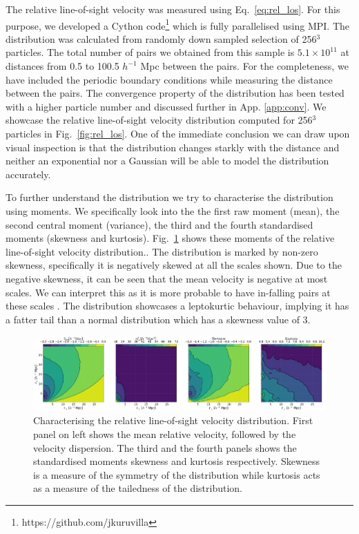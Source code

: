 \documentclass[a4paper,fleqn,usenatbib]{mnras}
\begin{document}
	The relative line-of-sight velocity was measured using Eq.~\ref{eq:rel_los}. For this purpose, we developed a Cython code\footnote{https://github.com/jkuruvilla} which is fully parallelised using MPI. The distribution was calculated from randomly down sampled selection of 256$^3$ particles. The total number of pairs we obtained from this sample is $5.1 \times 10^{11}$ at distances from 0.5 to 100.5 $h^{-1}$ Mpc between the pairs. For the completeness, we have included the periodic boundary conditions while measuring the distance between the pairs. The convergence property of the distribution has been tested with a higher particle number and discussed further in App. \ref{app:conv}. We showcase the relative line-of-sight velocity distribution computed for 256$^3$ particles in Fig.~\ref{fig:rel_los}. One of the immediate conclusion we can draw upon visual inspection is that the distribution changes starkly with the distance and neither an exponential nor a Gaussian will be able to model the distribution accurately. 
	
	To further understand the distribution we try to characterise the distribution using moments. We specifically look into the the first raw moment (mean), the second central moment (variance), the third and the fourth standardised moments (skewness and kurtosis). Fig.~\ref{fig:moments_2d} shows these moments of the relative line-of-sight velocity distribution.. The distribution is marked by non-zero skewness, specifically it is negatively skewed at all the scales shown.  Due to the negative skewness, it can be seen that the mean velocity is negative at most scales. We can interpret this as it is more probable to have in-falling pairs at these scales \citep{sc04}. The distribution showcases a leptokurtic behaviour, implying it has a fatter tail than a normal distribution which has a skewness value of 3.
	
	\begin{figure}
		\centering
		\includegraphics[scale=0.29]{los_moments}
		\caption{Characterising the relative line-of-sight velocity distribution. First panel on left shows the mean relative velocity, followed by the velocity dispersion. The third and the fourth panels shows the standardised moments skewness and kurtosis respectively. Skewness is a measure of the symmetry of the distribution while kurtosis acts as a measure of the tailedness of the distribution.}
		\label{fig:moments_2d}
	\end{figure}
	
\end{document}
